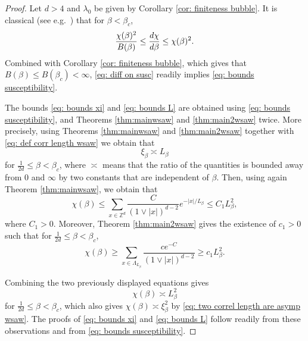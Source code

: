 \documentclass[11pt,a4paper]{article}
\numberwithin{equation}{section}
\theoremstyle{plain}
\theoremstyle{definition}
\begin{document}
\begin{proof} Let $d>4$ and $\lambda_0$ be given by Corollary \ref{cor: finiteness bubble}. It is classical (see e.g.~\cite[Sections~4.1--4.2]{BauerschmidtDCGoodmanSlade}) that for $\beta<\beta_c$,
\begin{equation}\label{eq: diff on susc}
\frac{\chi(\beta)^2}{B(\beta)}\le \frac{{\rm d}\chi}{{\rm d}\beta}\le  \chi(\beta)^2.
\end{equation}
Combined with Corollary \ref{cor: finiteness bubble}, which gives that $B(\beta)\leq B(\beta_c)<\infty$, \eqref{eq: diff on susc} readily implies \eqref{eq: bounds susceptibility}. 
%

The bounds \eqref{eq: bounds xi} and \eqref{eq: bounds L} are obtained using \eqref{eq: bounds susceptibility}, and Theorems \ref{thm:mainwsaw} and \ref{thm:main2wsaw} twice. More precisely, using Theorems \ref{thm:mainwsaw} and \ref{thm:main2wsaw} together with \eqref{eq: def corr length wsaw} we obtain that 
\begin{equation}\label{eq: two correl length are asymp wsaw}
	\xi_\beta\asymp L_\beta
\end{equation}
for $\tfrac{1}{2d}\leq\beta< \beta_c$, where $\asymp$ means that the ratio of the quantities is bounded away from $0$ and $\infty$ by two constants that are independent of $\beta$. Then, using again Theorem \ref{thm:mainwsaw}, we obtain that
\begin{equation}
	\chi(\beta)\leq\sum_{x\in \mathbb Z^d}\frac{C}{(1\vee |x|)^{d-2}}e^{-|x|/L_\beta}\leq C_1L_\beta^2,
\end{equation}
where $C_1>0$. Moreover, Theorem \ref{thm:main2wsaw} gives the existence of $c_1>0$ such that for $\tfrac{1}{2d}\leq \beta< \beta_c$,
\begin{equation}
	\chi(\beta)\geq \sum_{x\in \Lambda_{L_\beta}}\frac{ce^{-C}}{(1\vee |x|)^{d-2}}\geq c_1 L_\beta^2.
\end{equation}

Combining the two previously displayed equations gives
\begin{equation}
	\chi(\beta)\asymp L_\beta^2
\end{equation}
for $\tfrac{1}{2d}\leq\beta< \beta_c$, which also gives $\chi(\beta)\asymp \xi_\beta^2$ by \eqref{eq: two correl length are asymp wsaw}. The proofs of \eqref{eq: bounds xi} and \eqref{eq: bounds L} follow readily from these observations and from \eqref{eq: bounds susceptibility}. 
\end{proof}
\end{document}
